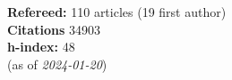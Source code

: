 \textbf{Refereed:} 110 articles (19 first author)\\\textbf{Citations} 34903\\\textbf{h-index:} 48\\(as of \textit{2024-01-20})
